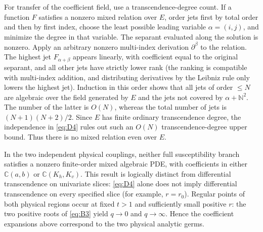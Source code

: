 \documentclass[11pt,a4paper]{article}
\numberwithin{equation}{section}
\theoremstyle{plain}
\theoremstyle{definition}
\begin{document}
For transfer of the coefficient field, use a transcendence-degree count. If a function \(F\) satisfies a nonzero mixed relation over \(E\), order jets first by total order and then by first index, choose the least possible leading variable \(\alpha=(i,j)\), and minimize the degree in that variable. The separant evaluated along the solution is nonzero. Apply an arbitrary nonzero multi-index derivation \(\partial^\beta\) to the relation. The highest jet \(F_{\alpha+\beta}\) appears linearly, with coefficient equal to the original separant, and all other jets have strictly lower rank (the ranking is compatible with multi-index addition, and distributing derivatives by the Leibniz rule only lowers the highest jet). Induction in this order shows that all jets of order \(\le N\) are algebraic over the field generated by \(E\) and the jets not covered by \(\alpha+\mathbb N^2\). The number of the latter is \(O(N)\), whereas the total number of jets is \((N+1)(N+2)/2\). Since \(E\) has finite ordinary transcendence degree, the independence in \eqref{eq:D4} rules out such an \(O(N)\) transcendence-degree upper bound. Thus there is no mixed relation even over \(E\).

In the two independent physical couplings, neither full susceptibility branch satisfies a nonzero finite-order mixed algebraic PDE, with coefficients in either \(\mathbb C(a,b)\) or \(\mathbb C(K_h,K_v)\). This result is logically distinct from differential transcendence on univariate slices: \eqref{eq:D4} alone does not imply differential transcendence on every specified slice (for example, \(r=r_0\)). Regular points of both physical regions occur at fixed \(t>1\) and sufficiently small positive \(r\): the two positive roots of \eqref{eq:B3} yield \(q\to0\) and \(q\to\infty\). Hence the coefficient expansions above correspond to the two physical analytic germs.
\end{document}
